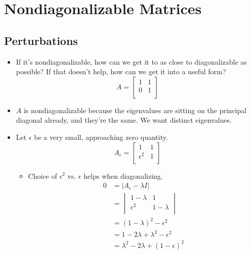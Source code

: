 \documentclass{article}
\begin{document}
\section*{Nondiagonalizable Matrices}
\subsection*{Perturbations}
\begin{itemize}
    \item {}If it's nondiagonalizable, how can we get it to as close to diagonalizable as possible? If that doesn't help, how can we get it into a useful form?
    \begin{equation*}
        A=
        \begin{bmatrix}
            1 & 1\\
            0 & 1\\
        \end{bmatrix}
    \end{equation*}
    \item $A$ is nondiagonalizable because the eigenvalues are sitting on the principal diagonal already, and they're the same. We want distinct eigenvalues.
    \item Let $\epsilon$ be a very small, approaching zero quantity.
    \begin{equation*}
        A_\epsilon =
        \begin{bmatrix}
            1 & 1\\
            \epsilon^2 & 1\\
        \end{bmatrix}
    \end{equation*}
    \begin{itemize}
        \item Choice of $\epsilon^2$ vs. $\epsilon$ helps when diagonalizing.
        \begin{align*}
            0 &= |A_\epsilon-\lambda I|\\
            &=
            \begin{vmatrix}
                1-\lambda & 1\\
                \epsilon^2 & 1-\lambda\\
            \end{vmatrix}\\
            &= (1-\lambda)^2-\epsilon^2\\
            &= 1-2\lambda+\lambda^2-\epsilon^2\\
            &= \lambda^2-2\lambda+(1-\epsilon)^2\\

\end{align*}
\end{itemize}
\end{itemize}
\end{document}
